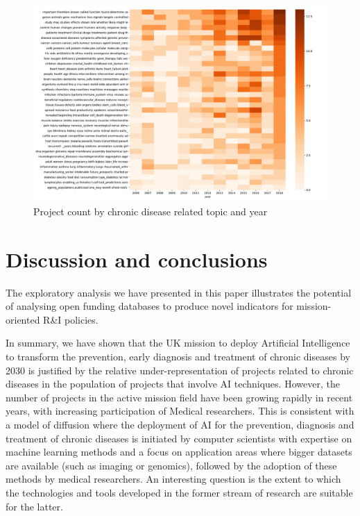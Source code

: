 \documentclass[11pt]{article}
\begin{document}
\begin{figure}[!ht]
    \centering
    \includegraphics[width=\textwidth]{figures/fig_21_heatmap.pdf}
    \caption{Project count by chronic disease related topic and year}
    \label{fig:cd_importance}
\end{figure}

\section{Discussion and conclusions}
\label{sec:conclusion}

The exploratory analysis we have presented in this paper illustrates the potential of analysing open funding databases to produce novel indicators for mission-oriented R\&I policies.

In summary, we have shown that the UK mission to deploy Artificial Intelligence to transform the prevention, early diagnosis and treatment of chronic diseases by 2030 is justified by the relative under-representation of projects related to chronic diseases in the population of projects that involve AI techniques. However, the number of projects in the active mission field have been growing rapidly in recent years, with increasing participation of Medical researchers. This is consistent with a model of diffusion where the deployment of AI for the prevention, diagnosis and treatment of chronic diseases is initiated by computer scientists with expertise on machine learning methods and a focus on application areas where bigger datasets are available (such as imaging or genomics), followed by the adoption of these methods by medical researchers. An interesting question is the extent to which the technologies and tools developed in the former stream of research are suitable for the latter. 
\end{document}
